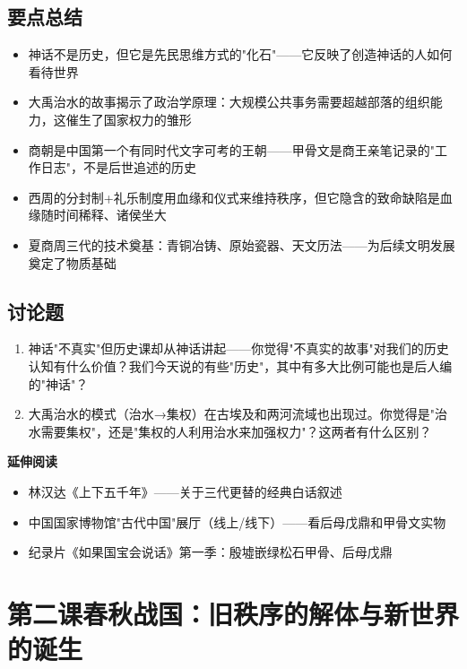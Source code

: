 \documentclass[a4paper,12pt]{ctexart}
\begin{document}
\subsection*{要点总结}
\begin{itemize}
  \item 神话不是历史，但它是先民思维方式的"化石"——它反映了创造神话的人如何看待世界
  \item 大禹治水的故事揭示了政治学原理：大规模公共事务需要超越部落的组织能力，这催生了国家权力的雏形
  \item 商朝是中国第一个有同时代文字可考的王朝——甲骨文是商王亲笔记录的"工作日志"，不是后世追述的历史
  \item 西周的分封制+礼乐制度用血缘和仪式来维持秩序，但它隐含的致命缺陷是血缘随时间稀释、诸侯坐大
  \item 夏商周三代的技术奠基：青铜冶铸、原始瓷器、天文历法——为后续文明发展奠定了物质基础
\end{itemize}

\subsection*{讨论题}
\begin{enumerate}
  \item 神话"不真实"但历史课却从神话讲起——你觉得"不真实的故事"对我们的历史认知有什么价值？我们今天说的有些"历史"，其中有多大比例可能也是后人编的"神话"？
  \item 大禹治水的模式（治水→集权）在古埃及和两河流域也出现过。你觉得是"治水需要集权"，还是"集权的人利用治水来加强权力"？这两者有什么区别？
\end{enumerate}

\vspace{0.3cm}
\textcolor{blue!70!black}{\textbf{延伸阅读}}
\begin{itemize}
  \item 林汉达《上下五千年》——关于三代更替的经典白话叙述
  \item 中国国家博物馆"古代中国"展厅（线上/线下）——看后母戊鼎和甲骨文实物
  \item 纪录片《如果国宝会说话》第一季：殷墟嵌绿松石甲骨、后母戊鼎
\end{itemize}

\newpage

\section{\textcolor{orange!80!black}{第二课\quad 春秋战国：旧秩序的解体与新世界的诞生}}
\end{document}
